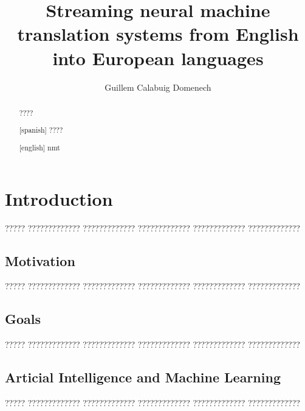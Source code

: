 \documentclass[11pt,english,listoffigures,listoftables]{tfgetsinf}
\title{Streaming neural machine translation systems from English into European languages}
\author{Guillem Calabuig Domenech}
\begin{document}

\begin{abstract}
????
\end{abstract}
\begin{abstract}[spanish]
????
\end{abstract}
\begin{abstract}[english]
nmt 
\end{abstract}


\mainmatter


\chapter{Introduction}

????? ????????????? ????????????? ????????????? ????????????? ?????????????

\section{Motivation}

????? ????????????? ????????????? ????????????? ????????????? ????????????? 

\section{Goals}

????? ????????????? ????????????? ????????????? ????????????? ?????????????

\section{Articial Intelligence and Machine Learning}
????? ????????????? ????????????? ????????????? ????????????? ?????????????
\end{document}
